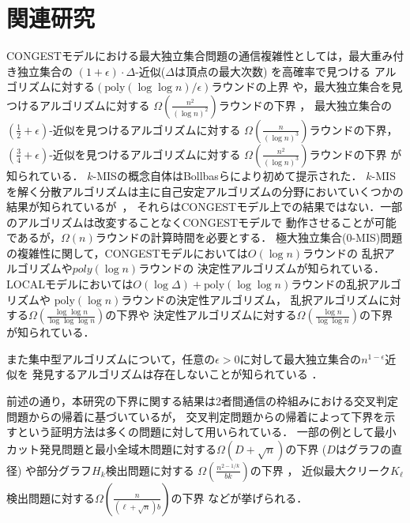 \documentclass[12pt]{thesis}
\newcommand{\CONGEST}{\textsf{CONGEST}}
\newcommand{\LOCAL}{\textsf{LOCAL}}
\theoremstyle{definition}
\begin{document}
\section{関連研究} 
{\CONGEST}モデルにおける最大独立集合問題の通信複雑性としては，最大重み付き独立集合の
$(1 + \epsilon) \cdot \Delta$-近似($\Delta$は頂点の最大次数) を高確率で見つける
アルゴリズムに対する$\left(\mathrm{poly}(\log \log n)/\epsilon \right)$ラウンドの上界
\cite{kawarabayashi2019improved} や，最大独立集合を見つけるアルゴリズムに対する
$\Omega \left(\frac{n^{2}}{(\log n)^{2}}\right)$ラウンドの下界 \cite{censor2017quadratic}，
最大独立集合の$(\frac{1}{2} + \epsilon)$-近似を見つけるアルゴリズムに対する
$\Omega \left(\frac{n}{(\log n)^{3}}\right)$ラウンドの下界，
$(\frac{3}{4} + \epsilon)$-近似を見つけるアルゴリズムに対する
$\Omega \left(\frac{n^{2}}{(\log n)^{3}}\right)$ラウンドの下界 \cite{efron2020beyond} が知られている．
$k$-MISの概念自体はBollbasらにより初めて提示された\cite{bollobas1991generalised}．
$k$-MISを解く分散アルゴリズムは主に自己安定アルゴリズムの分野においていくつかの結果が知られているが~\cite{turau2007linear,tanaka2019self}，
それらは{\CONGEST}モデル上での結果ではない．一部のアルゴリズムは改変することなく{\CONGEST}モデルで
動作させることが可能であるが，$\Omega(n)$ラウンドの計算時間を必要とする．
極大独立集合(0-MIS)問題の複雑性に関して，{\CONGEST}モデルにおいては$O(\log n)$ラウンドの
乱択アルゴリズム\cite{luby1986simple}や$poly(\log n)$ラウンドの
決定性アルゴリズム\cite{rozhovn2020polylogarithmic}が知られている．
{\LOCAL}モデルにおいては$O(\log \Delta) + \mathrm{poly}(\log \log n)$ラウンドの乱択アルゴリズムや
$\mathrm{poly}(\log n)$ラウンドの決定性アルゴリズム\cite{rozhovn2020polylogarithmic}，
乱択アルゴリズムに対する$\Omega \left(\frac{\log \log n}{\log \log \log n} \right)$の下界や
決定性アルゴリズムに対する$\Omega \left(\frac{\log n}{\log \log n} \right)$の下界
\cite{balliu2019lower}が知られている．

また集中型アルゴリズムについて，任意の$\epsilon > 0$に対して最大独立集合の$n^{1 - \epsilon}$近似を
発見するアルゴリズムは存在しないことが知られている \cite{haastad1999clique}．
 
前述の通り，本研究の下界に関する結果は2者間通信の枠組みにおける交叉判定問題からの帰着に基づいているが，
交叉判定問題からの帰着によって下界を示すという証明方法は多くの問題に対して用いられている．
一部の例として最小カット発見問題と最小全域木問題に対する$\Omega (D + \sqrt{n})$の下界
($D$はグラフの直径) \cite{sarma2012distributed}や部分グラフ$H_{k}$検出問題に対する
$\Omega \left(\frac{n^{2 - 1/k}}{bk}\right)$の下界 \cite{fischer2018possibilities}，
近似最大クリーク$K_{\ell}$検出問題に対する$\Omega \left(\frac{n}{(\ell + \sqrt{n})b}\right)$の下界
 \cite{czumaj2020detecting}などが挙げられる．
\end{document}
